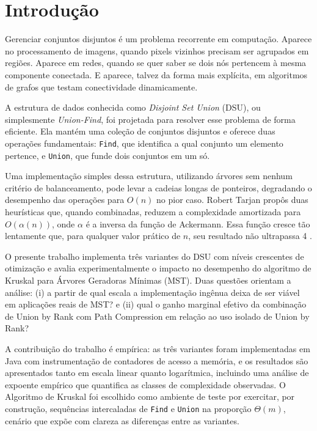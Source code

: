 \documentclass[12pt]{article}
\begin{document}
\section{Introdução}

Gerenciar conjuntos disjuntos é um problema recorrente em computação. Aparece no processamento de imagens, quando pixels vizinhos precisam ser agrupados em regiões. Aparece em redes, quando se quer saber se dois nós pertencem à mesma componente conectada. E aparece, talvez da forma mais explícita, em algoritmos de grafos que testam conectividade dinamicamente.

A estrutura de dados conhecida como \textit{Disjoint Set Union} (DSU), ou simplesmente \textit{Union-Find}, foi projetada para resolver esse problema de forma eficiente. Ela mantém uma coleção de conjuntos disjuntos e oferece duas operações fundamentais: \texttt{Find}, que identifica a qual conjunto um elemento pertence, e \texttt{Union}, que funde dois conjuntos em um só.

Uma implementação simples dessa estrutura, utilizando árvores sem nenhum critério de balanceamento, pode levar a cadeias longas de ponteiros, degradando o desempenho das operações para $O(n)$ no pior caso. Robert Tarjan propôs duas heurísticas que, quando combinadas, reduzem a complexidade amortizada para $O(\alpha(n))$, onde $\alpha$ é a inversa da função de Ackermann. Essa função cresce tão lentamente que, para qualquer valor prático de $n$, seu resultado não ultrapassa 4 \cite{tarjan1975}.

O presente trabalho implementa três variantes do DSU com níveis crescentes de otimização e avalia experimentalmente o impacto no desempenho do algoritmo de Kruskal para Árvores Geradoras Mínimas (MST). Duas questões orientam a análise: (i) a partir de qual escala a implementação ingênua deixa de ser viável em aplicações reais de MST? e (ii) qual o ganho marginal efetivo da combinação de Union by Rank com Path Compression em relação ao uso isolado de Union by Rank?

A contribuição do trabalho é empírica: as três variantes foram implementadas em Java com instrumentação de contadores de acesso a memória, e os resultados são apresentados tanto em escala linear quanto logarítmica, incluindo uma análise de expoente empírico que quantifica as classes de complexidade observadas. O Algoritmo de Kruskal foi escolhido como ambiente de teste por exercitar, por construção, sequências intercaladas de \texttt{Find} e \texttt{Union} na proporção $\Theta(m)$, cenário que expõe com clareza as diferenças entre as variantes.
\end{document}
